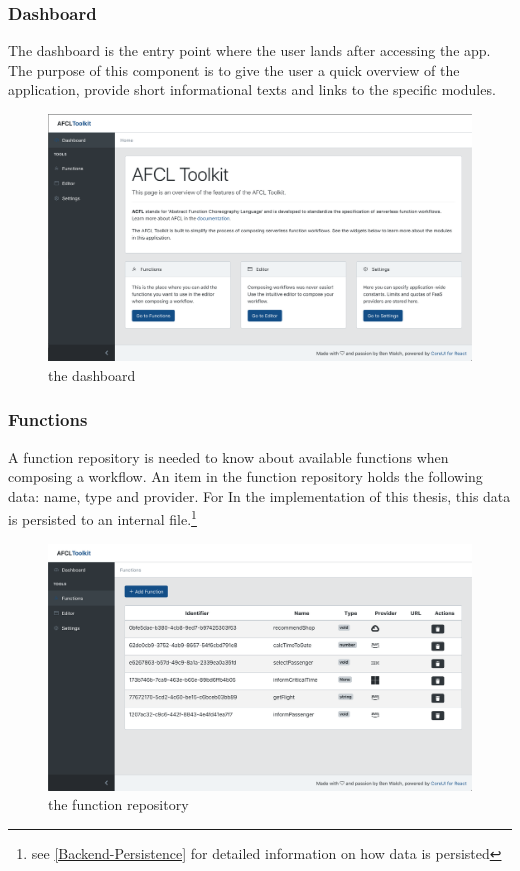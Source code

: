 \documentclass[a4paper,11pt,pdftex,halfparskip,cleardoubleempty]{scrbook}
\begin{document}
\subsubsection{Dashboard}

The dashboard is the entry point where the user lands after accessing the app. The purpose of this component is to give the user a quick overview of the application, provide short informational texts and links to the specific modules. 

\begin{figure}[ht]
  \centering
  \includegraphics[width=\textwidth]{dashboard}
  \caption{the dashboard}
\end{figure}

\subsubsection{Functions}

A function repository is needed to know about available functions when composing a workflow. An item in the function repository holds the following data: name, type and provider. For In the implementation of this thesis, this data is persisted to an internal file.\footnote{see \ref{Backend-Persistence} for detailed information on how data is persisted}

\begin{figure}[ht]
  \centering
  \includegraphics[width=\textwidth]{functions}
  \caption{the function repository}
\end{figure}
\end{document}
